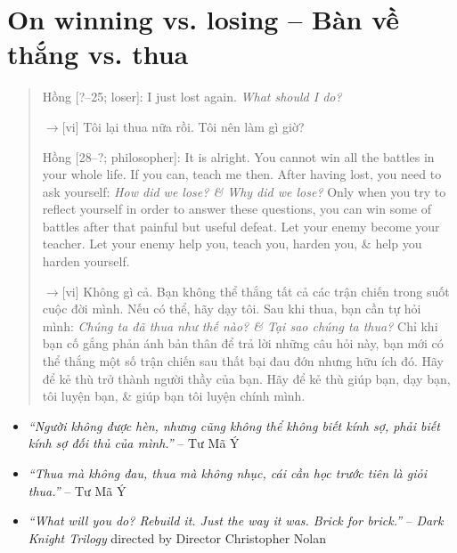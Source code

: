 \documentclass[12pt,oneside]{book}
\begin{document}
\section{On winning vs. losing -- Bàn về thắng vs. thua}

\begin{quote}
	{\sf Hồng [?--25; loser]}: I just lost again. {\it What should I do?}
	
	{\sf[en]$\to$[vi]} Tôi lại thua nữa rồi. Tôi nên làm gì giờ?
	
	{\sf Hồng [28--?; philosopher]}: It is alright. You cannot win all the battles in your whole life. If you can, teach me then. After having lost, you need to ask yourself: {\it How did we lose? \& Why did we lose?} Only when you try to reflect yourself in order to answer these questions, you can win some of battles after that painful but useful defeat. Let your enemy become your teacher. Let your enemy help you, teach you, harden you, \& help you harden yourself.
	
	{\sf[en]$\to$[vi]} Không gì cả. Bạn không thể thắng tất cả các trận chiến trong suốt cuộc đời mình. Nếu có thể, hãy dạy tôi. Sau khi thua, bạn cần tự hỏi mình: {\it Chúng ta đã thua như thế nào? \& Tại sao chúng ta thua?} Chỉ khi bạn cố gắng phản ánh bản thân để trả lời những câu hỏi này, bạn mới có thể thắng một số trận chiến sau thất bại đau đớn nhưng hữu ích đó. Hãy để kẻ thù trở thành người thầy của bạn. Hãy để kẻ thù giúp bạn, dạy bạn, tôi luyện bạn, \& giúp bạn tôi luyện chính mình.
\end{quote}

\begin{itemize}
	\item {\sf[cn$\to$vi]} {\it``Người không được hèn, nhưng cũng không thể không biết kính sợ, phải biết kính sợ đối thủ của mình.''} -- {\sc Tư Mã Ý}
	
	\item {\sf[cn$\to$vi]} {\it``Thua mà không đau, thua mà không nhục, cái cần học trước tiên là giỏi thua.''} -- {\sc Tư Mã Ý}
	
	\item {\it``What will you do? Rebuild it. Just the way it was. Brick for brick.''} -- {\it Dark Knight Trilogy} directed by Director {\sc Christopher Nolan}
\end{itemize}

\end{document}

